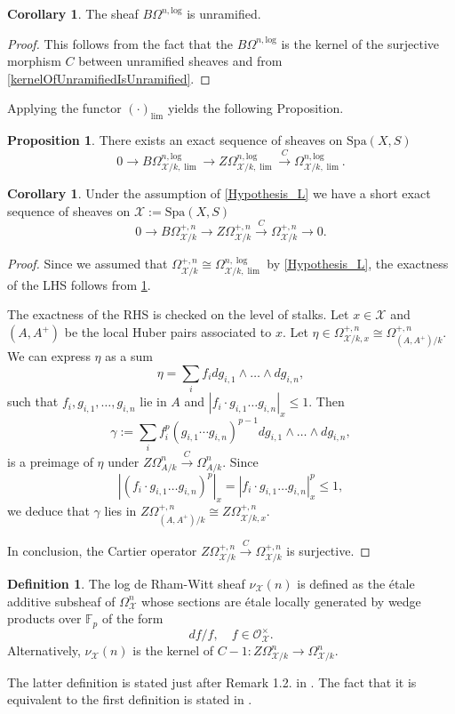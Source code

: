 \documentclass{amsart}
\def\Spa{\textrm{Spa}}
\theoremstyle{definition}
\newtheorem{definition}[theorem]{Definition}
\newtheorem{proposition}[theorem]{Proposition}
\newtheorem{corollary}[theorem]{Corollary}
\newcommand\llog{\mathrm{log}}
\numberwithin{equation}{section}
\begin{document}
\begin{corollary}\label{BOmegaUnramified}
	The sheaf $B\Omega^{n,\llog}$ is unramified.  
\end{corollary}
\begin{proof}
	This follows from the fact that the $B\Omega^{n,\llog}$ is the kernel of the surjective morphism $C$ between unramified sheaves and from \cref{kernelOfUnramifiedIsUnramified}.
\end{proof}
Applying the functor $(\cdot)_{\lim}$ yields the following Proposition.
\begin{proposition}\label{ShortExactOnClog}
	There exists an exact sequence of sheaves on $\Spa(X,S)$
\[
0\to B\Omega_{\mathcal{X}/k,\lim}^{n,\llog}\to Z\Omega_{\mathcal{X}/k,\lim}^{n,\llog}\xrightarrow{C}\Omega_{\mathcal{X}/k,\lim}^{n,\llog}.
\]
\end{proposition}
\begin{corollary}\label{ShortExactOnC}
	Under the assumption of \cref{Hypothesis_L} we have a short exact sequence of sheaves on $\mathcal{X}:=\Spa(X,S)$
	\[
	0\to B\Omega_{\mathcal{X}/k}^{+,n}\to Z\Omega_{\mathcal{X}/k}^{+,n}\xrightarrow{C}\Omega_{\mathcal{X}/k}^{+,n}\to 0.
	\]
\end{corollary}
\begin{proof}
	Since we assumed that $\Omega^{+,n}_{\mathcal{X}/k}\cong \Omega^{n,\log}_{\mathcal{X}/k,\lim}$ by \cref{Hypothesis_L}, the exactness of the LHS follows from \cref{ShortExactOnClog}. 
	
	The exactness of the RHS is checked on the level of stalks. Let $x\in \mathcal{X}$ and $(A,A^+)$ be the local Huber pairs associated to $x$. Let $\eta\in \Omega_{\mathcal{X}/k,x}^{+,n}\cong\Omega^{+,n}_{(A,A^+)/k}$. We can express $\eta$ as a sum 
	\[
	\eta = \sum_{i}f_i dg_{i,1}\wedge \dots \wedge dg_{i,n},
	\] 
	such that $f_i,g_{i,1},\dots ,g_{i,n}$ lie in $A$ and $|f_i\cdot g_{i,1} \dots  g_{i,n}|_x\leq 1$. Then 
	\[
	\gamma:= \sum_{i}f_i^{p}(g_{i,1}\cdots g_{i,n})^{p-1}dg_{i,1}\wedge \dots \wedge dg_{i,n},
	\]
	is a preimage of $\eta$ under $Z\Omega_{A/k}^{n}\xrightarrow{C}\Omega_{A/k}^{n}$. Since
	\[
	|(f_i\cdot g_{i,1} \dots  g_{i,n})^p|_x=|f_i\cdot g_{i,1} \dots  g_{i,n}|^p_x\leq 1,
	\]
	we deduce that $\gamma$ lies in $Z\Omega^{+,n}_{(A,A^+)/k}\cong Z\Omega^{+,n}_{\mathcal{X}/k,x}$.
	
	In conclusion, the Cartier operator $Z\Omega_{\mathcal{X}/k}^{+,n}\xrightarrow{C}\Omega_{\mathcal{X}/k}^{+,n}$ is surjective.
\end{proof}
\begin{definition}\label{Def:LogDeRhamWitt}
	The log de Rham-Witt sheaf $\nu_{\mathcal{X}}(n)$ is defined as the \'etale additive subsheaf of $\Omega_{\mathcal{X}}^{n}$ whose sections are \'etale locally generated by wedge products over $\mathbb{F}_p$ of the form
	\[
	df/f, \quad f\in \mathcal{O}_{\mathcal{X}}^\times.
	\]
	Alternatively, $\nu_{\mathcal{X}}(n)$ is the kernel of $C-1:Z\Omega_{\mathcal{X}/k}^n\to \Omega_{\mathcal{X}/k}^n$. 
	
	The latter definition is stated just after Remark 1.2. in \cite{MilneDuality}. The fact that it is equivalent to the first definition is stated in \cite[Lemma 1.6]{MilneValuesOfZeta}.
\end{definition}
\end{document}
